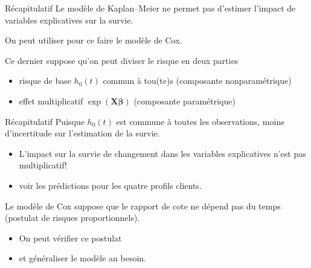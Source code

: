 \documentclass[
  ignorenonframetext,
]{beamer}
\providecommand{\tightlist}{%
  \setlength{\itemsep}{0pt}\setlength{\parskip}{0pt}}\usepackage{longtable,booktabs,array}
\begin{document}
\begin{frame}{Récapitulatif}
\protect\hypertarget{ruxe9capitulatif-5}{}
Le modèle de Kaplan--Meier ne permet pas d'estimer l'impact de variables
explicatives sur la survie.

On peut utiliser pour ce faire le modèle de Cox.

Ce dernier suppose qu'on peut diviser le risque en deux parties

\begin{itemize}
\tightlist
\item
  risque de base \(h_0(t)\) commun à tou(te)s (composante
  nonparamétrique)
\item
  effet multiplicatif \(\exp(\mathbf{X}\boldsymbol{\beta})\) (composante
  paramétrique)
\end{itemize}
\end{frame}

\begin{frame}{Récapitulatif}
\protect\hypertarget{ruxe9capitulatif-6}{}
Puisque \(h_0(t)\) est commune à toutes les observations, moins
d'incertitude sur l'estimation de la survie.

\begin{itemize}
\tightlist
\item
  L'impact sur la survie de changement dans les variables explicatives
  n'est pas multiplicatif!
\item
  voir les prédictions pour les quatre profils clients.
\end{itemize}

Le modèle de Cox suppose que le rapport de cote ne dépend pas du temps
(postulat de risques proportionnels).

\begin{itemize}
\tightlist
\item
  On peut vérifier ce postulat
\item
  et généraliser le modèle au besoin.
\end{itemize}
\end{frame}
\end{document}

